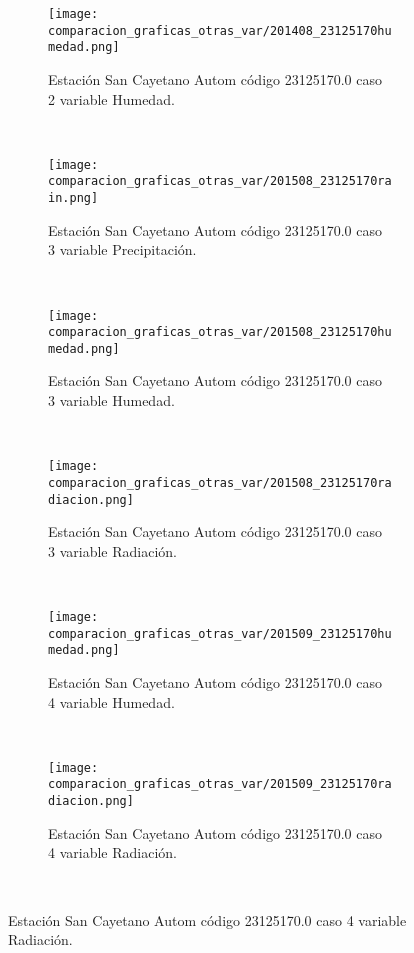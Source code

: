 \begin{figure}[H]
\centering
\begin{subfigure}[normla]{0.4\textwidth}
\caption{Estación San Cayetano Autom  código 23125170.0 caso 2 variable Humedad.}
\texttt{[image: comparacion\_graficas\_otras\_var/201408\_23125170humedad.png]}
\end{subfigure}
~
\begin{subfigure}[normla]{0.4\textwidth}
\caption{Estación San Cayetano Autom  código 23125170.0 caso 3 variable Precipitación.}
\texttt{[image: comparacion\_graficas\_otras\_var/201508\_23125170rain.png]}
\end{subfigure}
~
\begin{subfigure}[normla]{0.4\textwidth}
\caption{Estación San Cayetano Autom  código 23125170.0 caso 3 variable Humedad.}
\texttt{[image: comparacion\_graficas\_otras\_var/201508\_23125170humedad.png]}
\end{subfigure}
~
\begin{subfigure}[normla]{0.4\textwidth}
\caption{Estación San Cayetano Autom  código 23125170.0 caso 3 variable Radiación.}
\texttt{[image: comparacion\_graficas\_otras\_var/201508\_23125170radiacion.png]}
\end{subfigure}
~
\begin{subfigure}[normla]{0.4\textwidth}
\caption{Estación San Cayetano Autom  código 23125170.0 caso 4 variable Humedad.}
\texttt{[image: comparacion\_graficas\_otras\_var/201509\_23125170humedad.png]}
\end{subfigure}
~
\begin{subfigure}[normla]{0.4\textwidth}
\caption{Estación San Cayetano Autom  código 23125170.0 caso 4 variable Radiación.}
\texttt{[image: comparacion\_graficas\_otras\_var/201509\_23125170radiacion.png]}
\end{subfigure}
~
\end{figure}
           
